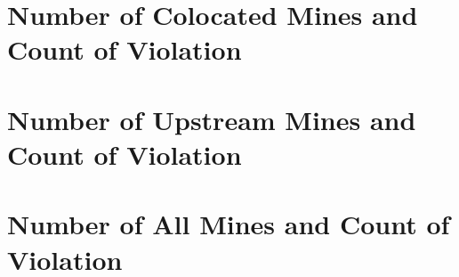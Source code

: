 \documentclass{beamer}
\begin{document}
\begin{frame}{}

\end{frame}

\section{Number of Colocated Mines and Count of Violation}

\begin{frame}{}

\end{frame}

\begin{frame}{}

\end{frame}

\begin{frame}{}

\end{frame}

\begin{frame}{}

\end{frame}

\section{Number of Upstream Mines and Count of Violation}

\begin{frame}{}

\end{frame}

\begin{frame}{}

\end{frame}

\begin{frame}{}

\end{frame}

\begin{frame}{}

\end{frame}

\section{Number of All Mines and Count of Violation}
\end{document}
